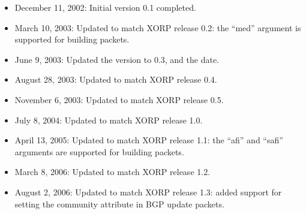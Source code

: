 \documentclass[11pt]{article}
\begin{document}
\begin{itemize}

  \item December 11, 2002: Initial version 0.1 completed.

  \item March 10, 2003: Updated to match XORP release 0.2: the ``med''
  argument is supported for building packets.

  \item June 9, 2003: Updated the version to 0.3, and the date.

  \item August 28, 2003: Updated to match XORP release 0.4.

  \item November 6, 2003: Updated to match XORP release 0.5.

  \item July 8, 2004: Updated to match XORP release 1.0.

  \item April 13, 2005: Updated to match XORP release 1.1: the ``afi'' and
  ``safi'' arguments are supported for building packets.

  \item March 8, 2006: Updated to match XORP release 1.2.

  \item August 2, 2006: Updated to match XORP release 1.3: added support for
  setting the community attribute in BGP update packets.

\end{itemize}



\end{document}
